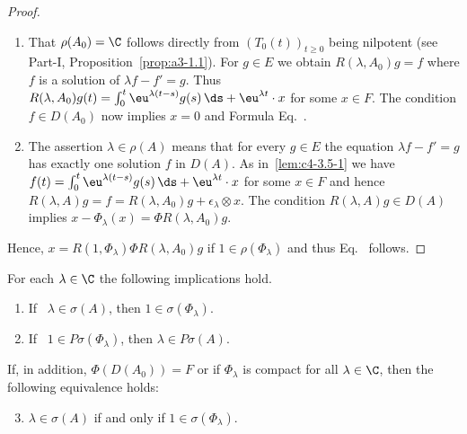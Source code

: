 \begin{proof}
\begin{enumerate}[\upshape (i), wide, labelindent=.25em] 
    \item 
    That $\rho(A_{0}) = \C$ follows directly from $(T_{0}(t))_{t \geq 0}$ being nilpotent (see Part-I, Proposition~\ref{prop:a3-1.1}). For $g \in E$ we obtain $R(\lambda,A_{0})g = f$ where $f$ is a solution of\/ $\lambda f - f' = g$.
    Thus $R(\lambda,A_{0})g(t) = \int_{0}^{t} \eu^{\lambda(t-s)}g(s)\, \ds + \eu^{\lambda t} \cdot x$ for some $x \in F$. The condition $f \in D(A_{0})$ now implies $x = 0$ and Formula Eq.~.
    
    \item 
    The assertion $\lambda \in \rho(A)$ means that for every $g \in E$ the equation $\lambda f - f' = g$ has exactly one solution $f$ in $D(A)$. As in~\ref{lem:c4-3.5-1} we have 
    $f(t) = \int_{0}^{t} \eu^{\lambda(t-s)}g(s)\, \ds + \eu^{\lambda t} \cdot x$ for some $x \in F$ and hence
    $R(\lambda,A)g = f = R(\lambda,A_{0})g + \epsilon_{\lambda}  \otimes x$. 
    The condition $R(\lambda,A)g \in D(A)$ implies $x - \Phi_{\lambda}(x) = \Phi R(\lambda,A_{0})g$. 
\end{enumerate}    
    Hence, $x = R(1,\Phi_{\lambda})\Phi R(\lambda,A_{0})g$ if\/ $1 \in \rho(\Phi_{\lambda})$ and thus Eq.~ follows.
\end{proof}
\begin{proposition}\label{prop:c4-3.6}
For each $\lambda \in \C$ the following implications hold.
\begin{enumerate}[\upshape (i)]
\item \label{prop:c4-3.6-1}
If \, $\lambda \in \sigma(A)$, then $1 \in \sigma(\Phi_{\lambda})$.
\item \label{prop:c4-3.6-2}
If \, $1 \in P\sigma(\Phi_{\lambda})$, then $\lambda \in P\sigma(A)$.
\end{enumerate}
If, in addition, $\Phi(D(A_{0})) = F$ or if\/ $\Phi_{\lambda}$ is compact for all $\lambda \in \C$, then the following equivalence holds:
\begin{enumerate}[\upshape (i)]
\setcounter{enumi}{2}
\item \label{prop:c4-3.6-3}
$\lambda \in \sigma(A)$ if and only if\/ $1 \in \sigma(\Phi_{\lambda})$.
\end{enumerate}
\end{proposition}
